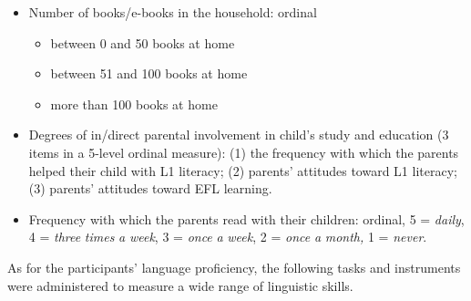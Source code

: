 \documentclass[output=paper,modfonts,nonflat,newtxmath]{langsci/langscibook}
\begin{document}
\begin{itemize}
\item
Number of books/e-books in the household: ordinal


\begin{itemize}
\item
between 0 and 50 books at home

\item
between 51 and 100 books at home

\item
more than 100 books at home

\end{itemize}
\item
Degrees of in/direct parental involvement in child’s study and education (3 items in a 5-level ordinal measure):
(1) the frequency with which the parents helped their child with L1 literacy;
(2) parents’ attitudes toward L1 literacy;
(3) parents’ attitudes toward EFL learning.

\item
Frequency with which the parents read with their children: ordinal, 5 = \textit{daily}, 4 = \textit{three} \textit{times} \textit{a} \textit{week}, 3 = \textit{once} \textit{a} \textit{week}, 2 = \textit{once} \textit{a} \textit{month,} 1 = \textit{never}.

\end{itemize}

As for the participants’ language proficiency, the following tasks and instruments were administered to measure a wide range of linguistic skills.
\end{document}
